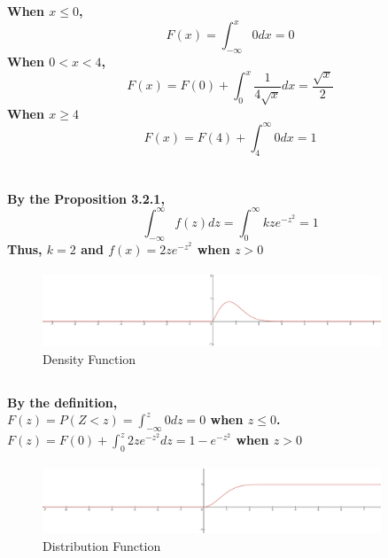\documentclass{article}
\begin{document}
        \subsection{}
            \paragraph{
                When $x\leq0$, 
                $$F(x)=\int _{-\infty} ^x 0 dx= 0$$
                When $0<x<4$,
                $$F(x)=F(0)+\int _0 ^x \frac{1}{4\sqrt{x}} dx =\frac{\sqrt{x}}{2}$$
                When $x \geq 4$
                $$F(x)=F(4)+\int _4 ^\infty 0 dx =1$$
            }
    \section{}
        \subsection{}
            \paragraph{
                By the Proposition 3.2.1,
                $$\int _{-\infty} ^\infty f(z) dz=\int _0 ^\infty kze^{-z^2} =1$$
                Thus, $k=2$ and $f(x)=2ze^{-z^2}$ when $z>0$
            }
            \begin{figure}[H] 
                \centering 
                \includegraphics[width=0.9\textwidth]{Assignment3-1.png} 
                \caption{Density Function} 
            \end{figure}
        \subsection{}
            \paragraph{
                By the definition,\\
                $F(z)=P(Z<z)=\int _{-\infty} ^z 0 dz =0$ when $z\leq0$.\\
                $F(z)=F(0)+\int _0 ^z 2ze^{-z^2} dz = 1- e^{-z^2}$ when $z>0$
            }
            \begin{figure}[H] 
                \centering 
                \includegraphics[width=0.9\textwidth]{Assignment3-2.png} 
                \caption{Distribution Function} 
            \end{figure}
\end{document}
